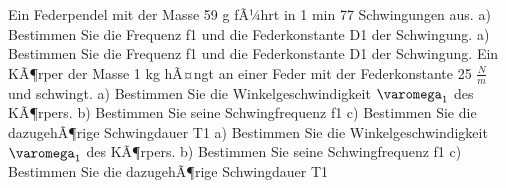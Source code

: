 \documentclass{article}
\begin{document}
Ein Federpendel mit der Masse 59 g fÃ¼hrt in 1 min 77 Schwingungen aus.
a) Bestimmen Sie die Frequenz f1 und die Federkonstante D1 der Schwingung.
a) Bestimmen Sie die Frequenz f1 und die Federkonstante D1 der Schwingung.
Ein KÃ¶rper der Masse 1 kg hÃ¤ngt an einer Feder mit der Federkonstante 25 $\frac{N}{m}$ und schwingt.
a) Bestimmen Sie die Winkelgeschwindigkeit $\varomega _1$ des KÃ¶rpers.
b) Bestimmen Sie seine Schwingfrequenz f1
c) Bestimmen Sie die dazugehÃ¶rige Schwingdauer T1
a) Bestimmen Sie die Winkelgeschwindigkeit $\varomega _1$ des KÃ¶rpers.
b) Bestimmen Sie seine Schwingfrequenz f1
c) Bestimmen Sie die dazugehÃ¶rige Schwingdauer T1
\end{document}
